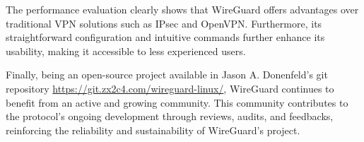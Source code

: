 \documentclass[light]{academica}
\begin{document}
The performance evaluation clearly shows that WireGuard offers advantages over traditional VPN solutions such as IPsec and OpenVPN.
Furthermore, its straightforward configuration and intuitive commands further enhance its usability, making it accessible to less experienced users.

Finally, being an open-source project available in Jason A. Donenfeld's git repository \url{https://git.zx2c4.com/wireguard-linux/}, WireGuard continues to benefit from an active and growing community.
This community contributes to the protocol’s ongoing development through reviews, audits, and feedbacks, reinforcing the reliability and sustainability of WireGuard's project.

\backmatter

\end{document}
